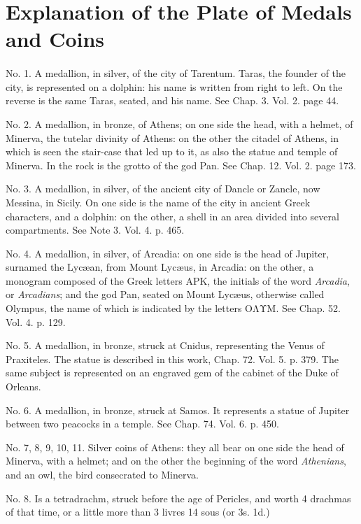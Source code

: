 \documentclass[a4paper, 11pt, oneside, polutonikogreek, english]{article}
\begin{document}
\clearpage
\section{Explanation of the Plate of Medals and Coins}
\paragraph{}
No. 1. A medallion, in silver, of the city of Tarentum. Taras, the founder of the city, is represented on a dolphin: his name is written from right to left. On the reverse is the same Taras, seated, and his name. See Chap. 3. Vol. 2. page 44.

No. 2. A medallion, in bronze, of Athens; on one side the head, with a helmet, of Minerva, the tutelar divinity of Athens: on the other the citadel of Athens, in which is seen the stair-case that led up to it, as also the statue and temple of Minerva. In the rock is the grotto of the god Pan. See Chap. 12. Vol. 2. page 173.

No. 3. A medallion, in silver, of the ancient city of Dancle or Zancle, now Messina, in Sicily. On one side is the name of the city in ancient Greek characters, and a dolphin: on the other, a shell in an area divided into several compartments. See Note 3. Vol. 4. p. 465.

No. 4. A medallion, in silver, of Arcadia: on one side is the head of Jupiter, surnamed the Lycæan, from Mount Lycæus, in Arcadia: on the other, a monogram composed of the Greek letters ΑΡΚ, the initials of the word \emph{Arcadia}, or \emph{Arcadians}; and the god Pan, seated on Mount Lycæus, otherwise called Olympus, the name of which is indicated by the letters ΟΛΥΜ. See Chap. 52. Vol. 4. p. 129.

No. 5. A medallion, in bronze, struck at Cnidus, representing the Venus of Praxiteles. The statue is described in this work, Chap. 72. Vol. 5. p. 379. The same subject is represented on an engraved gem of the cabinet of the Duke of Orleans.

No. 6. A medallion, in bronze, struck at Samos. It represents a statue of Jupiter between two peacocks in a temple. See Chap. 74. Vol. 6. p. 450.

No. 7, 8, 9, 10, 11. Silver coins of Athens: they all bear on one side the head of Minerva, with a helmet; and on the other the beginning of the word \emph{Athenians}, and an owl, the bird consecrated to Minerva.

No. 8. Is a tetradrachm, struck before the age of Pericles, and worth 4 drachmas of that time, or a little more than 3 livres 14 sous (or 3s. 1d.)
\end{document}
